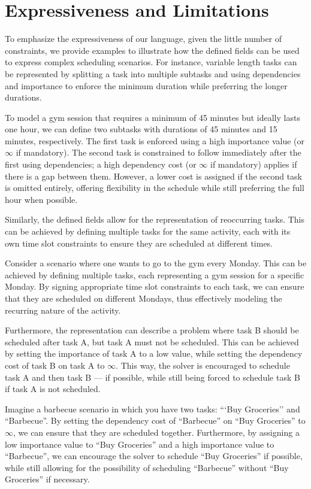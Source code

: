 \section{Expressiveness and Limitations}
To emphasize the expressiveness of our language, given the little number of constraints, we provide examples to illustrate how the defined fields can be used to express complex scheduling scenarios. For instance, variable length tasks can be represented by splitting a task into multiple subtasks and using dependencies and importance to enforce the minimum duration while preferring the longer durations.
\begin{example}
    To model a gym session that requires a minimum of 45 minutes but ideally lasts one hour, we can define two subtasks with durations of 45 minutes and 15 minutes, respectively. The first task is enforced using a high importance value (or $\infty$ if mandatory). The second task is constrained to follow immediately after the first using dependencies; a high dependency cost (or $\infty$ if mandatory) applies if there is a gap between them. However, a lower cost is assigned if the second task is omitted entirely, offering flexibility in the schedule while still preferring the full hour when possible.
\end{example}
Similarly, the defined fields allow for the representation of reoccurring tasks. This can be achieved by defining multiple tasks for the same activity, each with its own time slot constraints to ensure they are scheduled at different times.
\begin{example}
    Consider a scenario where one wants to go to the gym every Monday. This can be achieved by defining multiple tasks, each representing a gym session for a specific Monday. By signing appropriate time slot constraints to each task, we can ensure that they are scheduled on different Mondays, thus effectively modeling the recurring nature of the activity.
\end{example}
Furthermore, the representation can describe a problem where task B should be scheduled after task A, but task A must not be scheduled. This can be achieved by setting the importance of task A to a low value, while setting the dependency cost of task B on task A to $\infty$. This way, the solver is encouraged to schedule task A and then task B --- if possible, while still being forced to schedule task B if task A is not scheduled.
\begin{example}
    Imagine a barbecue scenario in which you have two tasks: ```Buy Groceries'' and ``Barbecue''. By setting the dependency cost of ``Barbecue'' on ``Buy Groceries'' to $\infty$, we can ensure that they are scheduled together. Furthermore, by assigning a low importance value to ``Buy Groceries'' and a high importance value to ``Barbecue'', we can encourage the solver to schedule ``Buy Groceries'' if possible, while still allowing for the possibility of scheduling ``Barbecue'' without ``Buy Groceries'' if necessary.
\end{example}

